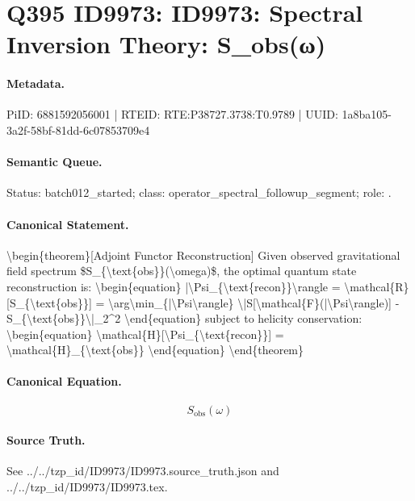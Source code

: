 \section*{Q395 ID9973: ID9973: Spectral Inversion Theory: S\_obs(ω)}
\paragraph{Metadata.}
PiID: 6881592056001 | RTEID: RTE:P38727.3738:T0.9789 | UUID: 1a8ba105-3a2f-58bf-81dd-6c07853709e4

\paragraph{Semantic Queue.}
Status: batch012\_started; class: operator\_spectral\_followup\_segment; role: .

\paragraph{Canonical Statement.}
\textbackslash{}begin\{theorem\}[Adjoint Functor Reconstruction] Given observed gravitational field spectrum \$S\_\{\textbackslash{}text\{obs\}\}(\textbackslash{}omega)\$, the optimal quantum state reconstruction is: \textbackslash{}begin\{equation\} |\textbackslash{}Psi\_\{\textbackslash{}text\{recon\}\}\textbackslash{}rangle = \textbackslash{}mathcal\{R\}[S\_\{\textbackslash{}text\{obs\}\}] = \textbackslash{}arg\textbackslash{}min\_\{|\textbackslash{}Psi\textbackslash{}rangle\} \textbackslash{}|S[\textbackslash{}mathcal\{F\}(|\textbackslash{}Psi\textbackslash{}rangle)] - S\_\{\textbackslash{}text\{obs\}\}\textbackslash{}|\_2\textasciicircum{}2 \textbackslash{}end\{equation\} subject to helicity conservation: \textbackslash{}begin\{equation\} \textbackslash{}mathcal\{H\}[\textbackslash{}Psi\_\{\textbackslash{}text\{recon\}\}] = \textbackslash{}mathcal\{H\}\_\{\textbackslash{}text\{obs\}\} \textbackslash{}end\{equation\} \textbackslash{}end\{theorem\}

\paragraph{Canonical Equation.}
\[
S_{\text{obs}}(\omega)
\]

\paragraph{Source Truth.}
See ../../tzp\_id/ID9973/ID9973.source\_truth.json and ../../tzp\_id/ID9973/ID9973.tex.
